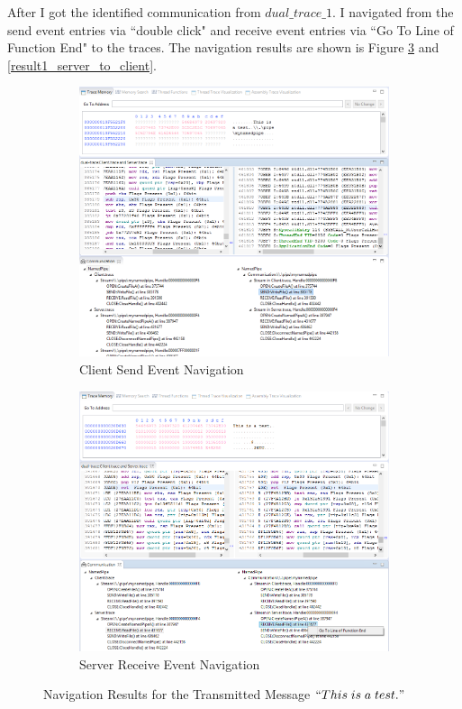 After I got the identified communication from $dual\_trace\_1$. I navigated from the send event entries via ``double click" and receive event entries via ``Go To Line of Function End" to the traces. The navigation results are shown is Figure \ref{result1_client_to_server} and \ref{result1_server_to_client}.

\begin{figure}[H]
\begin{subfigure}[H]{0.45\linewidth}
\includegraphics[scale=0.35]{Figures/result1_client_send}
 \caption{Client Send Event Navigation}
\label{result1_client_send}
\end{subfigure}
\hfill
\begin{subfigure}[H]{0.45\linewidth}
\includegraphics[scale=0.35]{Figures/result1_server_read}
 \caption{Server Receive Event Navigation}
\label{result1_server_read}
\end{subfigure}%
\caption{Navigation Results for the Transmitted Message $``This\; is\; a\; test."$}
\label{result1_client_to_server}
\end{figure}

